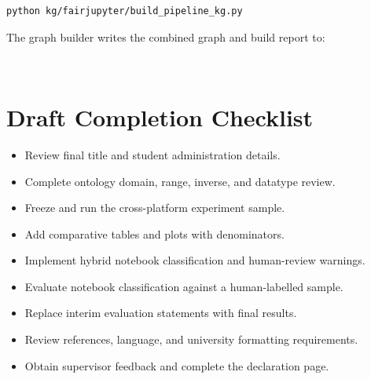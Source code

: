 \begin{lstlisting}[language=bash,caption={Build the pipeline knowledge graph.}]
python kg/fairjupyter/build_pipeline_kg.py
\end{lstlisting}

The graph builder writes the combined graph and build report to:
\begin{center}
\\
\end{center}

\section{Draft Completion Checklist}

\begin{itemize}
  \item[\texttt{[ ]}] Review final title and student administration details.
  \item[\texttt{[ ]}] Complete ontology domain, range, inverse, and datatype review.
  \item[\texttt{[ ]}] Freeze and run the cross-platform experiment sample.
  \item[\texttt{[ ]}] Add comparative tables and plots with denominators.
  \item[\texttt{[x]}] Implement hybrid notebook classification and human-review warnings.
  \item[\texttt{[ ]}] Evaluate notebook classification against a human-labelled sample.
  \item[\texttt{[ ]}] Replace interim evaluation statements with final results.
  \item[\texttt{[ ]}] Review references, language, and university formatting requirements.
  \item[\texttt{[ ]}] Obtain supervisor feedback and complete the declaration page.
\end{itemize}
